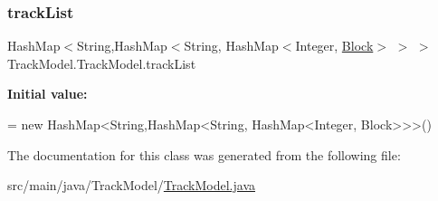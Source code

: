 \subsubsection{\texorpdfstring{track\+List}{trackList}}
{\footnotesize\ttfamily Hash\+Map$<$String,Hash\+Map$<$String, Hash\+Map$<$Integer, \hyperlink{classTrackModel_1_1Block}{Block}$>$ $>$ $>$ Track\+Model.\+Track\+Model.\+track\+List\hspace{0.3cm}{\ttfamily [package]}}

{\bfseries Initial value\+:}
\begin{DoxyCode}
=
        \textcolor{keyword}{new} HashMap<String,HashMap<String, HashMap<Integer, Block>>>()
\end{DoxyCode}


The documentation for this class was generated from the following file\+:\begin{DoxyCompactItemize}
\item 
src/main/java/\+Track\+Model/\hyperlink{TrackModel_8java}{Track\+Model.\+java}\end{DoxyCompactItemize}
